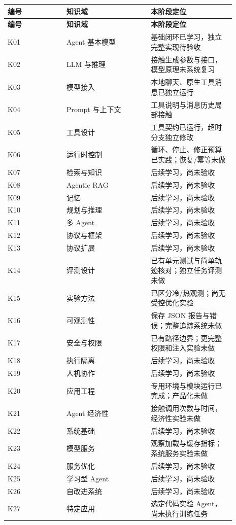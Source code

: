 \documentclass[UTF8,zihao=-4,fontset=fandol]{ctexart}
\begin{document}
{\small\setlength{\tabcolsep}{4pt}
\renewcommand{\arraystretch}{1.25}
\begin{longtable}{>{\raggedright\arraybackslash}p{0.23\linewidth}>{\raggedright\arraybackslash}p{0.33\linewidth}>{\raggedright\arraybackslash}p{0.33\linewidth}}
\toprule
\textbf{编号} & \textbf{知识域} & \textbf{本阶段定位} \\
\midrule\endfirsthead
\toprule
\textbf{编号} & \textbf{知识域} & \textbf{本阶段定位} \\
\midrule\endhead
\bottomrule\endfoot
K01 & Agent 基本模型 & 基础闭环已学习，独立完整实现待验收 \\
K02 & LLM 与推理 & 接触生成参数与接口，模型原理未系统复习 \\
K03 & 模型接入 & 本地聊天、原生工具消息已独立运行 \\
K04 & Prompt 与上下文 & 工具说明与消息历史局部接触 \\
K05 & 工具设计 & 工具契约已运行，超时分支独立修改 \\
K06 & 运行时控制 & 循环、停止、修正预算已实践；恢复/幂等未做 \\
K07 & 检索与知识 & 后续学习，尚未验收 \\
K08 & Agentic RAG & 后续学习，尚未验收 \\
K09 & 记忆 & 后续学习，尚未验收 \\
K10 & 规划与推理 & 后续学习，尚未验收 \\
K11 & 多 Agent & 后续学习，尚未验收 \\
K12 & 协议与框架 & 后续学习，尚未验收 \\
K13 & 协议扩展 & 后续学习，尚未验收 \\
K14 & 评测设计 & 已有单元测试与简单轨迹核对；独立任务评测未做 \\
K15 & 实验方法 & 已区分冷/热观测；尚无受控优化实验 \\
K16 & 可观测性 & 保存 JSON 报告与错误；完整追踪系统未做 \\
K17 & 安全与权限 & 已有路径边界；更完整权限和注入实验未做 \\
K18 & 执行隔离 & 后续学习，尚未验收 \\
K19 & 人机协作 & 后续学习，尚未验收 \\
K20 & 应用工程 & 专用环境与模块运行已完成；产品化未做 \\
K21 & Agent 经济性 & 接触调用次数与时间，经济性实验未做 \\
K22 & 系统基础 & 后续学习，尚未验收 \\
K23 & 模型服务 & 观察加载与缓存指标；系统服务实验未做 \\
K24 & 服务优化 & 后续学习，尚未验收 \\
K25 & 学习型 Agent & 后续学习，尚未验收 \\
K26 & 自改进系统 & 后续学习，尚未验收 \\
K27 & 特定应用 & 选定代码实验 Agent，尚未执行训练任务 \\
\end{longtable}}
\end{document}
